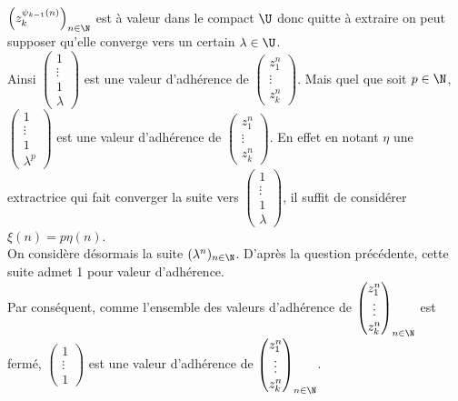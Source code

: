 \documentclass{book}
\begin{document}
\begin{enumerate}
		$\left(z_k^{\psi_{k-1}(n)}\right)_{n\in \N}$ est à valeur dans le compact $\U$ donc quitte à extraire on peut supposer qu'elle converge vers un certain $\lambda\in \U$.\\
		Ainsi $\begin{pmatrix}1\\\vdots\\1\\\lambda\end{pmatrix}$ est une valeur d'adhérence de $\begin{pmatrix}z_1^n\\\vdots\\z_k^n\end{pmatrix}$. Mais quel que soit $p\in \N$, $\begin{pmatrix}1\\\vdots\\1\\\lambda^p\end{pmatrix}$ est une valeur d'adhérence de $\begin{pmatrix}z_1^n\\\vdots\\z_k^n\end{pmatrix}$. En effet en notant $\eta$ une extractrice qui fait converger la suite vers $\begin{pmatrix}1\\\vdots\\1\\\lambda\end{pmatrix}$, il suffit de considérer $\xi(n)=p\eta(n)$.\\
		On considère désormais la suite $(\lambda^n)_{n\in \N}$. D'après la question précédente, cette suite admet 1 pour valeur d'adhérence.\\
		Par conséquent, comme l'ensemble des valeurs d'adhérence de $\begin{pmatrix}z_1^n\\\vdots\\z_k^n\end{pmatrix}_{n\in \N}$ est fermé, $\begin{pmatrix}1\\\vdots\\1\end{pmatrix}$ est une valeur d'adhérence de $\begin{pmatrix}z_1^n\\\vdots\\z_k^n\end{pmatrix}_{n\in \N}$.\\

\end{enumerate}
\end{document}
